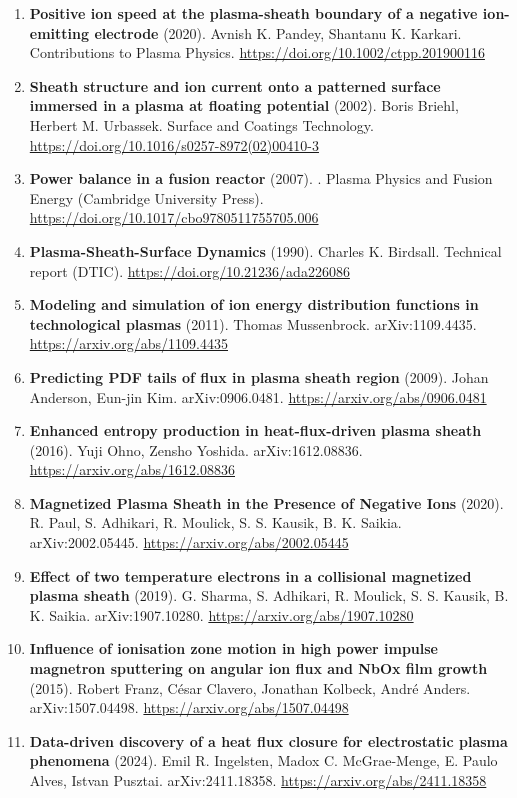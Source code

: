 \documentclass[11pt,a4paper]{article}
\begin{document}
\begin{enumerate}[leftmargin=1.4em]
\item \textbf{Positive ion speed at the plasma-sheath boundary of a negative ion-emitting electrode} (2020). Avnish K. Pandey, Shantanu K. Karkari. Contributions to Plasma Physics. \url{https://doi.org/10.1002/ctpp.201900116}
\item \textbf{Sheath structure and ion current onto a patterned surface immersed in a plasma at floating potential} (2002). Boris Briehl, Herbert M. Urbassek. Surface and Coatings Technology. \url{https://doi.org/10.1016/s0257-8972(02)00410-3}
\item \textbf{Power balance in a fusion reactor} (2007). . Plasma Physics and Fusion Energy (Cambridge University Press). \url{https://doi.org/10.1017/cbo9780511755705.006}
\item \textbf{Plasma-Sheath-Surface Dynamics} (1990). Charles K. Birdsall. Technical report (DTIC). \url{https://doi.org/10.21236/ada226086}
\item \textbf{Modeling and simulation of ion energy distribution functions in technological plasmas} (2011). Thomas Mussenbrock. arXiv:1109.4435. \url{https://arxiv.org/abs/1109.4435}
\item \textbf{Predicting PDF tails of flux in plasma sheath region} (2009). Johan Anderson, Eun-jin Kim. arXiv:0906.0481. \url{https://arxiv.org/abs/0906.0481}
\item \textbf{Enhanced entropy production in heat-flux-driven plasma sheath} (2016). Yuji Ohno, Zensho Yoshida. arXiv:1612.08836. \url{https://arxiv.org/abs/1612.08836}
\item \textbf{Magnetized Plasma Sheath in the Presence of Negative Ions} (2020). R. Paul, S. Adhikari, R. Moulick, S. S. Kausik, B. K. Saikia. arXiv:2002.05445. \url{https://arxiv.org/abs/2002.05445}
\item \textbf{Effect of two temperature electrons in a collisional magnetized plasma sheath} (2019). G. Sharma, S. Adhikari, R. Moulick, S. S. Kausik, B. K. Saikia. arXiv:1907.10280. \url{https://arxiv.org/abs/1907.10280}
\item \textbf{Influence of ionisation zone motion in high power impulse magnetron sputtering on angular ion flux and NbOx film growth} (2015). Robert Franz, César Clavero, Jonathan Kolbeck, André Anders. arXiv:1507.04498. \url{https://arxiv.org/abs/1507.04498}
\item \textbf{Data-driven discovery of a heat flux closure for electrostatic plasma phenomena} (2024). Emil R. Ingelsten, Madox C. McGrae-Menge, E. Paulo Alves, Istvan Pusztai. arXiv:2411.18358. \url{https://arxiv.org/abs/2411.18358}

\end{enumerate}
\end{document}
